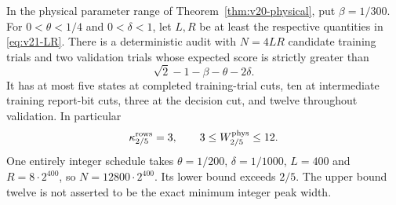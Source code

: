 \begin{theorem}\label{thm:v21-physical}
In the physical parameter range of Theorem~\ref{thm:v20-physical}, put
$\beta=1/300$. For $0<\theta<1/4$ and $0<\delta<1$, let $L,R$ be at least the respective quantities in
\eqref{eq:v21-LR}. There is a deterministic audit with $N=4LR$ candidate
training trials and two validation trials whose expected score is
strictly greater than
\begin{equation}\label{eq:v21-smallscore}
 \sqrt2-1-\beta-\theta-2\delta.
\end{equation}
It has at most five states at completed training-trial cuts, ten at
intermediate training report-bit cuts, three at the decision cut, and
twelve throughout validation. In particular
\begin{equation}\label{eq:v21-physicalwidth}
 \kappa_{2/5}^{\rm rows}=3,
 \qquad 3\le W_{2/5}^{\rm phys}\le12.
\end{equation}
One entirely integer schedule takes
$\theta=1/200$, $\delta=1/1000$, $L=400$ and $R=8\cdot2^{400}$,
so $N=12800\cdot2^{400}$. Its lower bound exceeds $2/5$.
The upper bound twelve is not asserted to be the exact minimum integer
peak width.
\end{theorem}

